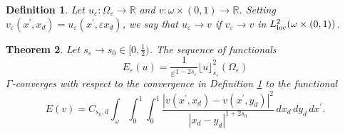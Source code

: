 \documentclass[11pt]{article}
\newtheorem{definition}{Definition}[section]
\newtheorem{theorem}[definition]{Theorem}
\def\e{\varepsilon}
\begin{document}
\begin{definition}\label{def2}
Let $u_\e\colon\Omega_\e\to\mathbb R$ and $v\colon\omega\times(0,1)\to\mathbb R$. Setting $v_\e(x^\prime, x_d)=u_\e(x^\prime, \e x_d)$, we say that $u_\e\to v$ if 
$v_\e\to v$ in $L^2_{\rm loc}(\omega\times(0,1))$. 
\end{definition}

\begin{theorem} 
Let $s_\e\to s_0\in[0,\frac{1}{2})$. 
The sequence of functionals 
$$E_\e(u)=\frac{1}{\e^{1-2s_\e}}\lfloor u\rfloor_{s_\e}^2(\Omega_\e)$$ 
$\Gamma$-converges with respect to the convergence in Definition {\rm\ref{def2}} to the functional 
$$E(v)=C_{s_0,d}\int_{\omega}\int_0^1\int_0^1\frac{|v(x^\prime, x_d)-v(x^\prime, y_d)|^2}{|x_d-y_d|^{1+2s_0}}\, dx_d\, dy_d\, dx^\prime.$$
\end{theorem} 
\end{document}
